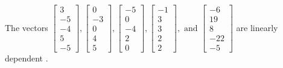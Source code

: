 \begin{exercise}
\begin{exerciseStatement}
  \end{exerciseStatement}
  \begin{exerciseAnswer}
   The vectors \(\left[\begin{array}{r}
3 \\
-5 \\
-4 \\
5 \\
-5
\end{array}\right] , \left[\begin{array}{r}
0 \\
-3 \\
0 \\
4 \\
5
\end{array}\right] , \left[\begin{array}{r}
-5 \\
0 \\
-4 \\
2 \\
0
\end{array}\right] , \left[\begin{array}{r}
-1 \\
3 \\
3 \\
2 \\
2
\end{array}\right] , \text{ and } \left[\begin{array}{r}
-6 \\
19 \\
8 \\
-22 \\
-5
\end{array}\right]\) are 
  	 linearly dependent  .
  


  \end{exerciseAnswer}
\end{exercise}